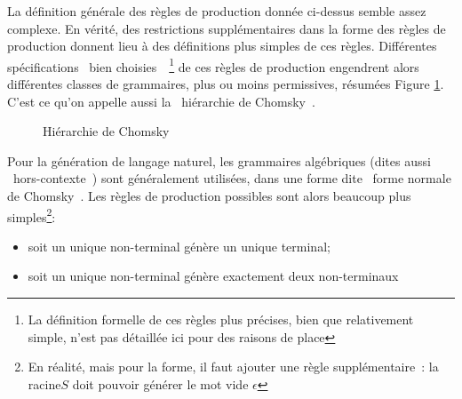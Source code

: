 \documentclass{article}
\begin{document}
				La définition générale des règles de production donnée ci-dessus semble assez complexe. En vérité, des restrictions supplémentaires dans la forme des règles de production donnent lieu à des définitions plus simples de ces règles. Différentes spécifications \guillemotleft~bien choisies~\guillemotright~\footnote{La définition formelle de ces règles plus précises, bien que relativement simple, n'est pas détaillée ici pour des raisons de place} de ces règles de production engendrent alors différentes classes de grammaires, plus ou moins permissives, résumées Figure \ref{fig:chomsky_hierarchy}. C'est ce qu'on appelle aussi la \guillemotleft~hiérarchie de Chomsky~\guillemotright.
				\begin{figure}[H]
					\centering
						\caption{Hiérarchie de Chomsky}
						\label{fig:chomsky_hierarchy}
					\end{figure}
					Pour la génération de langage naturel, les grammaires algébriques (dites aussi \guillemotleft~hors-contexte~\guillemotright) sont généralement utilisées, dans une forme dite \guillemotleft~forme normale de Chomsky~\guillemotright. Les règles de production possibles sont alors beaucoup plus simples\footnote{En réalité, mais pour la forme, il faut ajouter une règle supplémentaire~: la racine$S$ doit pouvoir générer le mot vide $\epsilon$}:
				\vspace{2mm}
				\begin{itemize}
					\item soit un unique non-terminal génère un unique terminal;
					\item soit un unique non-terminal génère exactement deux non-terminaux
				\end{itemize}
\end{document}
